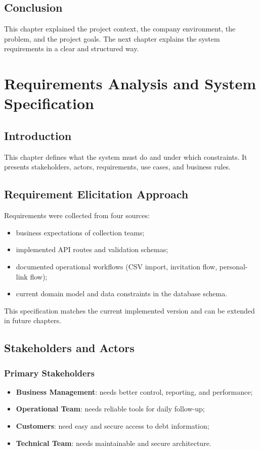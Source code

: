 \documentclass[12pt,a4paper]{report}
\begin{document}
\section*{Conclusion}
This chapter explained the project context, the company environment, the problem, and the project goals. The next chapter explains the system requirements in a clear and structured way.

\chapter{Requirements Analysis and System Specification}
\label{chap:requirements-analysis}

\section*{Introduction}
This chapter defines what the system must do and under which constraints. It presents stakeholders, actors, requirements, use cases, and business rules.

\section{Requirement Elicitation Approach}
Requirements were collected from four sources:
\begin{itemize}
  \item business expectations of collection teams;
  \item implemented API routes and validation schemas;
  \item documented operational workflows (CSV import, invitation flow, personal-link flow);
  \item current domain model and data constraints in the database schema.
\end{itemize}

This specification matches the current implemented version and can be extended in future chapters.

\section{Stakeholders and Actors}
\subsection{Primary Stakeholders}
\begin{itemize}
  \item \textbf{Business Management}: needs better control, reporting, and performance;
  \item \textbf{Operational Team}: needs reliable tools for daily follow-up;
  \item \textbf{Customers}: need easy and secure access to debt information;
  \item \textbf{Technical Team}: needs maintainable and secure architecture.
\end{itemize}
\end{document}
